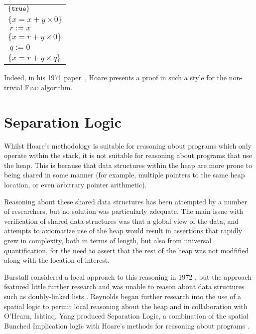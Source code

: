 \documentclass[a4paper]{report}
\begin{document}
  \begin{tabular}{l}
    $\{\texttt{true}\}$ \\
    $\{x = x + y \times 0\}$ \\
    $\ r:=x$ \\
    $\{x = r + y \times 0\}$ \\
    $\ q:=0$ \\
    $\{x = r + y \times q\}$
  \end{tabular}

  Indeed, in his 1971 paper~\cite{Hoare1971proof}, Hoare presents a proof in
  such a style for the non-trivial \textsc{Find} algorithm.


\section{Separation Logic}

  Whilst Hoare's methodology is suitable for reasoning about programs which only
  operate within the stack, it is not suitable for reasoning about programs that
  use the heap. This is because that data structures within the heap are more
  prone to being shared in some manner (for example, multiple pointers to the
  same heap location, or even arbitrary pointer arithmetic).
 
  Reasoning about these shared data structures has been attempted by a number of
  researchers, but no solution was particularly adequate. The main issue with
  verification of shared data structures was that a global view of the data, and
  attempts to axiomatize use of the heap would result in assertions
  that rapidly grew in complexity, both in terms of length, but also from
  universal quantification, for the need to assert that the rest of the heap was
  not modfified along with the location of interest.

  Burstall considered a local approach to this reasoning in 1972
  \cite{burstall1972some}, but the approach featured little further research and
  was unable to reason about data structures such as doubly-linked lists
  \cite{reynolds2000intuitionistic}. Reynolds began further research into the
  use of a spatial logic to permit local reasoning about the heap and in
  collaboration with O'Hearn, Ishtiaq, Yang produced Separation Logic, a
  combination of the spatial Bunched Implication logic with Hoare's methods for
  reasoning about programs
  \cite{Ishtiaq2001BI,OHearn2001Local,reynolds2000intuitionistic,Reynolds2002Separation}.
\end{document}
